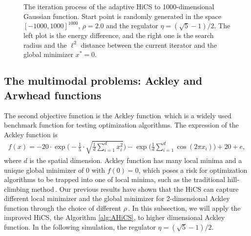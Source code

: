 \documentclass[mathpazo]{csam}
\theoremstyle{remark}
\begin{document}
\begin{figure}[!htbp]
\begin{minipage}[b]{0.5\linewidth}
{	  }
	\end{minipage}
	  \caption{The iteration process of the adaptive HiCS to 1000-dimensional Gaussian function. 
	  Start point is randomly generated in the space $[-1000,
	  1000]^{1000}$, $\rho=2.0$ and the regulator
	  $\eta=(\sqrt{5}-1)/2$. The left plot is the energy
	  difference, and the right one is the search radius and 
	  the $\ell^2$ distance between the current iterator and the
	  global minimizer $x^*=0$.
	  } 
	  \label{fig:gauss:1000D}
\end{figure}

\subsection{The multimodal problems: Ackley and Arwhead functions}
\label{subsec:minmulit}

The second objective function is the Ackley
function\,\cite{stacey2003particle, dieterich2012empirical} which is a widely used 
benchmark function for testing optimization algorithms.
The expression of the Ackley function is
\begin{align}
	f(x) =
	-20\cdot\exp\Bigg(-\frac{1}{5}\cdot\sqrt{\frac{1}{d}\sum_{i=1}^d
	x_i^2}\Bigg)-
	\exp\Bigg(\frac{1}{d}\sum_{i=1}^d \cos(2\pi x_i)\Bigg)+20+e,
	\label{eqn:ackley}
\end{align}
where $d$ is the spatial dimension.
Ackley function has many local minima and a unique global
minimizer of $0$ with $f(0)=0$, which poses a risk for
optimization algorithms to be trapped into one of local
minima, such as the traditional hill-climbing method\,\cite{back1996evolutionary}.
Our previous results have shown that the HiCS can capture
different local minimizer and the global minimizer for 2-dimensional Ackley
function through the choice of different $\rho$\,\cite{huang2017hill}.
In this subsection, we will apply the improved HiCS, the Algorithm \ref{alg:AHiCS},
to higher dimensional Ackley function. 
In the following simulation, the regulator
$\eta=(\sqrt{5}-1)/2$.
\end{document}
